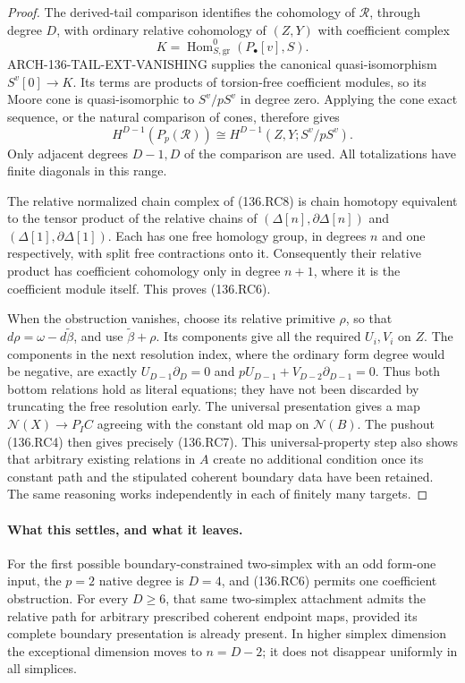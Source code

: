 \begin{proof}
The derived-tail comparison identifies the cohomology of
\(\mathcal R\), through degree \(D\), with ordinary relative
cohomology of \((Z,Y)\) with coefficient complex
\[
 K=\operatorname{Hom}^0_{S,\mathrm{gr}}(P_\bullet[v],S).
\]
ARCH-136-TAIL-EXT-VANISHING supplies the canonical
quasi-isomorphism \(S^v[0]\to K\). Its terms are products
of torsion-free coefficient modules, so its Moore cone is
quasi-isomorphic to \(S^v/pS^v\) in degree zero. Applying
the cone exact sequence, or the natural comparison of cones,
therefore gives
\[
               H^{D-1}(P_p(\mathcal R))
                  \cong H^{D-1}(Z,Y;S^v/pS^v).           \tag{136.RC12}
\]
Only adjacent degrees \(D-1,D\) of the comparison are used.
All totalizations have finite diagonals in this range.

The relative normalized chain complex of (136.RC8) is chain
homotopy equivalent to the tensor product of the relative chains
of \((\Delta[n],\partial\Delta[n])\) and
\((\Delta[1],\partial\Delta[1])\). Each has one free
homology group, in degrees \(n\) and one respectively,
with split free contractions onto it. Consequently their relative
product has coefficient cohomology only in degree \(n+1\),
where it is the coefficient module itself. This proves (136.RC6).

When the obstruction vanishes, choose its relative primitive
\(\rho\), so that \(d\rho=\omega-d\widetilde\beta\),
and use \(\widetilde\beta+\rho\). Its components give
all the required \(U_i,V_i\) on \(Z\). The components
in the next resolution index, where the ordinary form degree
would be negative, are exactly
\(U_{D-1}\partial_D=0\) and
\(pU_{D-1}+V_{D-2}\partial_{D-1}=0\).
Thus both bottom relations hold as literal equations; they have
not been discarded by truncating the free resolution early.
The universal presentation gives a map
\(\mathcal N(X)\to P_I C\) agreeing with the constant
old map on \(\mathcal N(B)\). The pushout (136.RC4)
then gives precisely (136.RC7). This universal-property step
also shows that arbitrary existing relations in \(A\) create
no additional condition once its constant path and the stipulated
coherent boundary data have been retained. The same reasoning
works independently in each of finitely many targets.
\end{proof}

\paragraph{What this settles, and what it leaves.}
For the first possible boundary-constrained two-simplex with an
odd form-one input, the \(p=2\) native degree is \(D=4\),
and (136.RC6) permits one coefficient obstruction. For every
\(D\geq6\), that same two-simplex attachment admits the
relative path for arbitrary prescribed coherent endpoint maps,
provided its complete boundary presentation is already present.
In higher simplex dimension the exceptional dimension moves to
\(n=D-2\); it does not disappear uniformly in all simplices.

